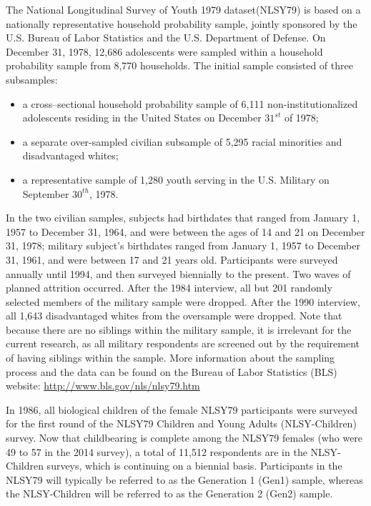 The National Longitudinal Survey of Youth 1979 dataset(NLSY79) is based on a nationally representative household probability sample, jointly sponsored by the U.S. Bureau of Labor Statistics and the U.S. Department of Defense. On December 31, 1978, 12,686 adolescents were sampled within a household probability sample from 8,770 households. The initial sample consisted of three subsamples: \begin{itemize}\item a cross--sectional household probability sample of 6,111 non-institutionalized adolescents residing in the United States on December $31^{st}$ of 1978; \item a separate over-sampled civilian subsample of 5,295 racial minorities and disadvantaged whites; \item a representative sample of 1,280 youth serving in the U.S. Military on September $30^{th}$, 1978.\end{itemize} In the two civilian samples, subjects had birthdates that ranged from January 1, 1957 to December 31, 1964, and were between the ages of 14 and 21 on December 31, 1978; military subject's birthdates ranged from January 1, 1957 to December 31, 1961, and were between 17 and 21 years old. Participants were surveyed annually until 1994, and then surveyed biennially to the present. Two waves of planned attrition occurred. After the 1984 interview, all but 201 randomly selected members of the military sample were dropped. After the 1990 interview, all 1,643 disadvantaged whites from the oversample were dropped. Note that because there are no siblings within the military sample, it is irrelevant for the current research, as all military respondents are screened out by the requirement of having siblings within the sample. More information about the sampling process and the data can be found on the Bureau of Labor Statistics (BLS) website: \url{http://www.bls.gov/nls/nlsy79.htm}

In 1986, all biological children of the female NLSY79 participants were surveyed for the first round of the NLSY79 Children and Young Adults (NLSY-Children) survey. Now that childbearing is complete among the NLSY79 females (who were 49 to 57 in the 2014 survey), a total of 11,512 respondents are in the NLSY-Children surveys, which is continuing on a biennial basis. Participants in the NLSY79 will typically be referred to as the Generation 1 (Gen1) sample, whereas the NLSY-Children will be referred to as the Generation 2 (Gen2) sample.